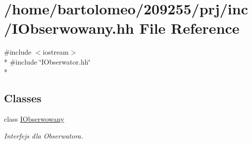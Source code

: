 \hypertarget{_i_obserwowany_8hh}{\section{/home/bartolomeo/209255/prj/inc/\-I\-Obserwowany.hh File Reference}
\label{_i_obserwowany_8hh}
}
{\ttfamily \#include $<$iostream$>$}\\*
{\ttfamily \#include \char`\"{}I\-Obserwator.\-hh\char`\"{}}\\*
\subsection*{Classes}
\begin{DoxyCompactItemize}
\item 
class \hyperlink{class_i_obserwowany}{I\-Obserwowany}
\begin{DoxyCompactList}\small\item\em Interfejs dla Obserwatora. \end{DoxyCompactList}\end{DoxyCompactItemize}
